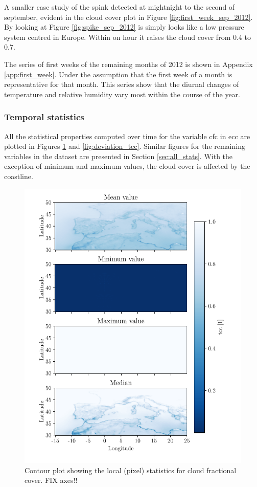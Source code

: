 A smaller case study of the spink detected at mightnight to the second of september, evident in the cloud cover plot in Figure \ref{fig:first_week_sep_2012}. By looking at Figure \ref{fig:spike_sep_2012} is simply looks like a low pressure system centred in Europe. Within on hour it raises the cloud cover from 0.4 to 0.7.  

The series of first weeks of the remaining months of 2012 is shown in Appendix \ref{app:first_week}. Under the assumption that the first week of a month is representative for that month. This series show that the diurnal changes of temperature and relative humidity vary most within the course of the year. 

\subsubsection{Temporal statistics}
All the statistical properties computed over time for the variable \acrshort{cfc} in \acrshort{ecc} are plotted in 
Figures \ref{fig:all_stats_tcc} and \ref{fig:deviation_tcc}. Similar figures for the remaining variables in the dataset are presented in Section \ref{sec:all_stats}. 
With the exception of minimum and maximum values, the cloud cover is affected by the coastline. 
\begin{figure}[ht]
    \centering
    \includegraphics{python_figs/all_stat_variable_tcc.pdf}
    \caption{Contour plot showing the local (pixel) statistics for cloud fractional cover. FIX axes!! }
    \label{fig:all_stats_tcc}
\end{figure}
